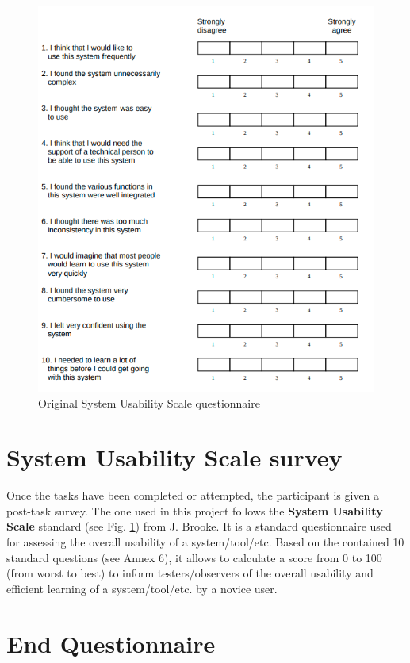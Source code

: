 \documentclass[twocolumn, letterpaper,13pt]{scrartcl}
\begin{document}
    \begin{figure}	\includegraphics[width=0.98\linewidth]{SUS.png}
    \caption{Original System Usability Scale questionnaire\label{fig:b}}
    \end{figure}

    \section*{System Usability Scale survey}
    
    Once the tasks have been completed or attempted, the participant is given a post-task survey. The one used in this project follows the \textbf{System Usability Scale} standard (see Fig. \ref{fig:b}) from J. Brooke\cite{brook}. It is a standard questionnaire used for assessing the overall usability of a system/tool/etc. Based on the contained 10 standard questions (see Annex 6), it allows to calculate a score from 0 to 100 (from worst to best) to inform testers/observers of the overall usability and efficient learning of a system/tool/etc. by a novice user.
    
    \section*{End Questionnaire}
    
\end{document}
